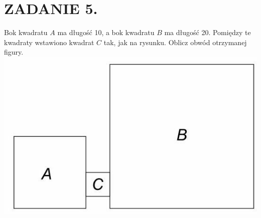 \documentclass[10pt]{article}
\begin{document}
\section*{ZADANIE 5.}
Bok kwadratu \(A\) ma długość 10, a bok kwadratu \(B\) ma długość 20. Pomiędzy te kwadraty wstawiono kwadrat \(C\) tak, jak na rysunku. Oblicz obwód otrzymanej figury.\\
\includegraphics[max width=\textwidth, center]{2024_11_21_1bed3b49e20da7fb8c35g-1(2)}
\end{document}
